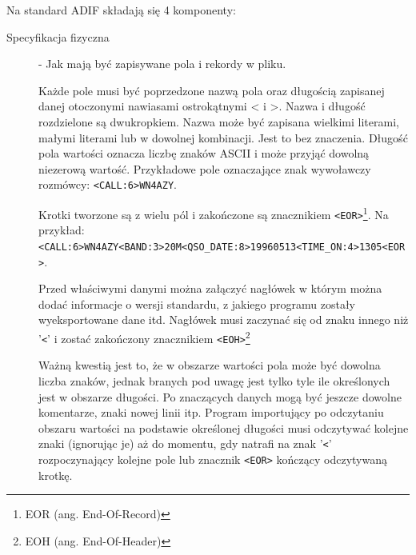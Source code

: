 \documentclass[]{mgr}
\begin{document}
            Na standard ADIF składają się 4 komponenty:
            \begin{description}
                \item[Specyfikacja fizyczna] - Jak mają być zapisywane pola i rekordy w pliku.

                Każde pole musi być poprzedzone nazwą pola oraz długością zapisanej danej otoczonymi nawiasami ostrokątnymi < i >. Nazwa i długość rozdzielone są dwukropkiem. Nazwa może być zapisana wielkimi literami, małymi literami lub w dowolnej kombinacji. Jest to bez znaczenia. Długość pola wartości oznacza liczbę znaków ASCII i może przyjąć dowolną niezerową wartość. Przykładowe pole oznaczające znak wywoławczy rozmówcy: \texttt{<CALL:6>WN4AZY}. 

                Krotki tworzone są z wielu pól i zakończone są znacznikiem \texttt{<EOR>}\footnote{EOR (ang. End-Of-Record)}. Na przykład: \texttt{<CALL:6>WN4AZY<BAND:3>20M<QSO\_DATE:8>19960513<TIME\_ON:4>1305<EOR>}.

                Przed właściwymi danymi można załączyć nagłówek w którym można dodać informacje o wersji standardu, z jakiego programu zostały wyeksportowane dane itd. Nagłówek musi zaczynać się od znaku innego niż '\texttt{<}' i zostać zakończony znacznikiem \texttt{<EOH>}\footnote{EOH (ang. End-Of-Header)}

                Ważną kwestią jest to, że w obszarze wartości pola może być dowolna liczba znaków, jednak branych pod uwagę jest tylko tyle ile określonych jest w obszarze długości. Po znaczących danych mogą być jeszcze dowolne komentarze, znaki nowej linii itp. Program importujący po odczytaniu obszaru wartości na podstawie określonej długości musi odczytywać kolejne znaki (ignorując je) aż do momentu, gdy natrafi na znak '\texttt{<}' rozpoczynający kolejne pole lub znacznik \texttt{<EOR>} kończący odczytywaną krotkę.


\end{description}
\end{document}
